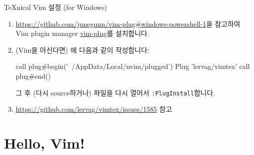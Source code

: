 \documentclass{beamer}
\begin{document}
\begin{frame}{\TeX{}nical Vim 설정 (for Windows)}
\begin{enumerate}
    \framebreak
  \item \url{https://github.com/junegunn/vim-plug#windows-powershell-1}을
    참고하여 Vim plugin manager \href{https://github.com/junegunn/vim-plug}{vim-plug}를 설치합니다.
    \item (Vim을 아신다면) 에 다음과
      같이 작성합니다:
      \begin{vimcode}
        call plug#begin('~/AppData/Local/nvim/plugged')
        Plug 'lervag/vimtex'
        call plug#end()
      \end{vimcode}
      그 후 (다시 source하거나) 파일을 다시 열어서 \verb/:PlugInstall/합니다.


    \framebreak
    \item \url{https://github.com/lervag/vimtex/issues/1585} 참고
  \end{enumerate}
\end{frame}

\section{Hello, Vim!}
\end{document}
